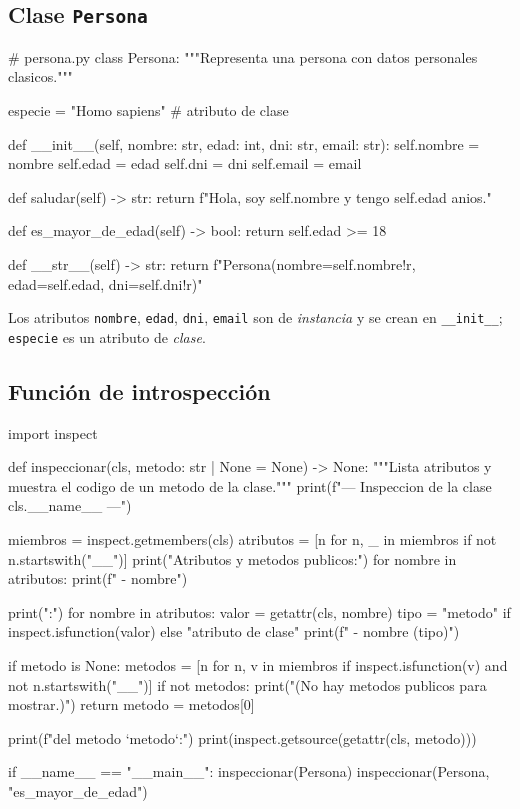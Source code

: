 \documentclass[11pt,a4paper]{article}
\theoremstyle{plain}
\theoremstyle{definition}
\theoremstyle{remark}
\begin{document}
\subsection*{Clase \texttt{Persona}}

\begin{pycode}
# persona.py
class Persona:
    """Representa una persona con datos personales clasicos."""

    especie = "Homo sapiens"  # atributo de clase

    def __init__(self, nombre: str, edad: int, dni: str, email: str):
        self.nombre = nombre
        self.edad = edad
        self.dni = dni
        self.email = email

    def saludar(self) -> str:
        return f"Hola, soy {self.nombre} y tengo {self.edad} anios."

    def es_mayor_de_edad(self) -> bool:
        return self.edad >= 18

    def __str__(self) -> str:
        return f"Persona(nombre={self.nombre!r}, edad={self.edad}, dni={self.dni!r})"
\end{pycode}

Los atributos \texttt{nombre}, \texttt{edad}, \texttt{dni}, \texttt{email} son
de \emph{instancia} y se crean en \texttt{\_\_init\_\_}; \texttt{especie} es
un atributo de \emph{clase}.

\subsection*{Funci\'on de introspecci\'on}

\begin{pycode}
import inspect

def inspeccionar(cls, metodo: str | None = None) -> None:
    """Lista atributos y muestra el codigo de un metodo de la clase."""
    print(f"--- Inspeccion de la clase {cls.__name__} ---")

    miembros = inspect.getmembers(cls)
    atributos = [n for n, _ in miembros if not n.startswith("__")]
    print("Atributos y metodos publicos:")
    for nombre in atributos:
        print(f"  - {nombre}")

    print("\nClasificacion:")
    for nombre in atributos:
        valor = getattr(cls, nombre)
        tipo = "metodo" if inspect.isfunction(valor) else "atributo de clase"
        print(f"  - {nombre} ({tipo})")

    if metodo is None:
        metodos = [n for n, v in miembros
                   if inspect.isfunction(v) and not n.startswith("__")]
        if not metodos:
            print("\n(No hay metodos publicos para mostrar.)")
            return
        metodo = metodos[0]

    print(f"\nCodigo del metodo `{metodo}`:")
    print(inspect.getsource(getattr(cls, metodo)))


if __name__ == "__main__":
    inspeccionar(Persona)
    inspeccionar(Persona, "es_mayor_de_edad")
\end{pycode}
\end{document}

